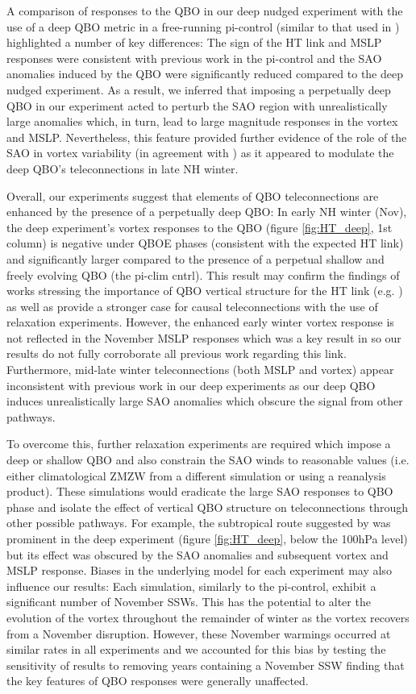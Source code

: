 A comparison of responses to the QBO in our deep nudged experiment with the use of a deep QBO metric in a free-running pi-control (similar to that used in \cite{andrewsObserved2019d}) highlighted a number of key differences: The sign of the HT link and MSLP responses were consistent with previous work in the pi-control and the SAO anomalies induced by the QBO were significantly reduced compared to the deep nudged experiment. As a result, we inferred that imposing a perpetually deep QBO in our experiment acted to perturb the SAO region with unrealistically large anomalies which, in turn, lead to large magnitude responses in the vortex and MSLP. Nevertheless, this feature provided further evidence of the role of the SAO in vortex variability (in agreement with \cite{grayForecasting2020}) as it appeared to modulate the deep QBO's teleconnections in late NH winter. 

Overall, our experiments suggest that elements of QBO teleconnections are enhanced by the presence of a perpetually deep QBO: In early NH winter (Nov), the deep experiment's vortex responses to the QBO (figure \ref{fig:HT_deep}, 1st column) is negative under QBOE phases (consistent with the expected HT link) and significantly larger compared to the presence of a perpetual shallow and freely evolving QBO (the pi-clim cntrl). This result may confirm the findings of works stressing the importance of QBO vertical structure for the HT link (e.g. \cite{graySurface2018b}) as well as provide a stronger case for causal teleconnections with the use of relaxation experiments. However, the enhanced early winter vortex response is not reflected in the November MSLP responses which was a key result in \cite{andrewsObserved2019d} so our results do not fully corroborate all previous work regarding this link. Furthermore, mid-late winter teleconnections (both MSLP and vortex) appear inconsistent with previous work in our deep experiments as our deep QBO induces unrealistically large SAO anomalies which obscure the signal from other pathways. 

To overcome this, further relaxation experiments are required which impose a deep or shallow QBO and also constrain the SAO winds to reasonable values (i.e. either climatological ZMZW from a different simulation or using a reanalysis product). These simulations would eradicate the large SAO responses to QBO phase and isolate the effect of vertical QBO structure on teleconnections through other possible pathways. For example, the subtropical route suggested by \cite{graySurface2018b} was prominent in the deep experiment (figure \ref{fig:HT_deep}, below the 100hPa level) but its effect was obscured by the SAO anomalies and subsequent vortex and MSLP response. Biases in the underlying model for each experiment may also influence our results: Each simulation, similarly to the pi-control, exhibit a significant number of November SSWs. This has the potential to alter the evolution of the vortex throughout the remainder of winter as the vortex recovers from a November disruption. However, these November warmings occurred at similar rates in all experiments and we accounted for this bias by testing the sensitivity of results to removing years containing a November SSW finding that the key features of QBO responses were generally unaffected.

